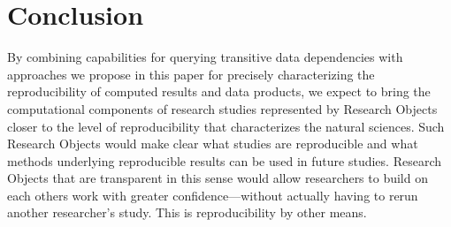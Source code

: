 \section{Conclusion}\label{sec-conclusion}

By combining capabilities for querying transitive data dependencies with 
	approaches we propose in this paper for precisely characterizing the reproducibility
	of computed
	results and data products, we expect to bring the computational components of research
	studies represented by Research Objects 
	closer to the level of reproducibility that characterizes the natural sciences.
Such Research Objects would make clear what studies are reproducible and what methods
	underlying reproducible
	results can be used in future studies.
Research Objects that are transparent in this sense would allow researchers to build 
	on each others work with greater confidence---without 
	actually having to rerun another researcher's study.
This is reproducibility by other means.

